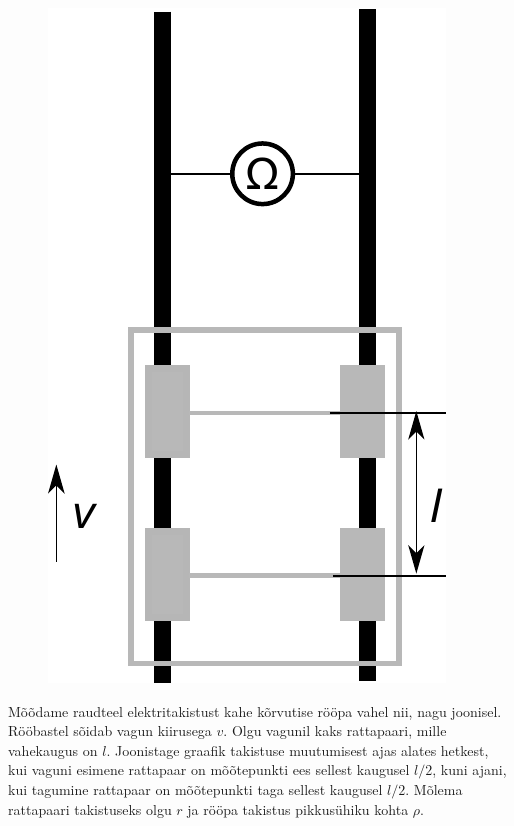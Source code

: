 
\begin{figure}%
\vspace{-15pt}
\includegraphics[width=\linewidth]{2012-v2g-08-rong}%
\end{figure}
Mõõdame raudteel elektritakistust kahe kõrvutise rööpa vahel nii, nagu joonisel.
Rööbastel sõidab vagun kiirusega $v$. Olgu vagunil kaks rattapaari,
mille vahekaugus on $l$. Joonistage graafik takistuse muutumisest ajas alates
hetkest, kui vaguni esimene rattapaar on mõõtepunkti ees sellest kaugusel $l/2$, kuni
ajani, kui tagumine rattapaar on mõõtepunkti taga sellest kaugusel $l/2$. Mõlema rattapaari
takistuseks olgu $r$ ja rööpa takistus pikkusühiku kohta $\rho$.

